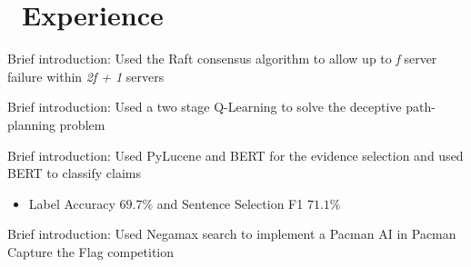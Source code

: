 \documentclass{resume}
\begin{document}
\section{\faUsers\ Experience}

Brief introduction: Used the Raft consensus algorithm to allow up to \textit{f} server failure within \textit{2f + 1} servers




Brief introduction: Used a two stage Q-Learning to solve the deceptive path-planning problem


Brief introduction: Used PyLucene and BERT for the evidence selection and used BERT to classify claims
\begin{itemize}
  \item Label Accuracy $69.7\%$ and Sentence Selection F1 $71.1\%$
\end{itemize}


Brief introduction: Used Negamax search to implement a Pacman AI in Pacman Capture the Flag competition




\end{document}
